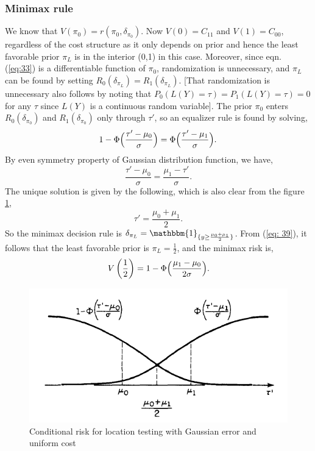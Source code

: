 \documentclass[a4paper,english,12pt]{article}
\begin{document}
\begin{exmp}
\subsubsection*{Minimax rule}
We know that $V(\pi_0)=r(\pi_0,\delta_{\pi_{0}})$. Now $V(0)=C_{11}$ and $V(1)=C_{00}$, regardless of the cost structure as it only depends on prior and hence the least favorable prior $\pi_{L}$ is in the interior (0,1) in this case. Moreover, since eqn. (\ref{eq:33}) is a differentiable function of $\pi_{0}$, randomization is unnecessary, and $\pi_{L}$ can be found by setting $R_{0}(\delta_{\pi_{L}})=R_{1}(\delta_{\pi_{L}})$. [That randomization is unnecessary also follows by noting that $P_{0}(L(Y)=\tau)=P_{1}(L(Y)=\tau)=0$ for any $\tau$ since $L(Y)$ is a continuous random variable]. The prior $\pi_{0}$ enters $R_{0}(\delta_{\pi_{0}})$ and $R_{1}(\delta_{\pi_{0}})$ only through $\tau'$, so an equalizer rule is found by solving,
\begin{equation}
1-\Phi\Bigl(\frac{\tau'-\mu_0}{\sigma}\Bigr)=\Phi\Bigl(\frac{\tau'-\mu_1}{\sigma}\Bigr).
\end{equation}
By even symmetry property of Gaussian distribution function, we have,
\begin{equation}
\frac{\tau'-\mu_0}{\sigma}=\frac{\mu_1-\tau'}{\sigma}.
\end{equation}
The unique solution is given by the following, which is also clear from the figure \ref{fig:minimaxerror},
\begin{equation}
\tau'=\frac{\mu_{0}+\mu_{1}}{2}.\label{eq: 39}
\end{equation}
So the minimax decision rule is $\delta_{\pi_L}=\mathbbm{1}_{\{ y\geq\frac{\mu_{0}+\mu_{1}}{2}\}}$. From (\ref{eq: 39}), it follows that the least favorable prior is $\pi_L=\frac{1}{2}$, and the minimax risk is,
\begin{equation}
V\left(\frac{1}{2}\right)=1-\Phi\Bigl(\frac{\mu_1-\mu_0}{2\sigma}\Bigr).
\end{equation}
\begin{figure}[h]
\centering
\includegraphics[width=0.6\linewidth]{Figures/Gauss_Minimax}
\caption{Conditional risk for location testing with Gaussian error and uniform cost}
\label{fig:minimaxerror}
\end{figure}

\end{exmp}
\end{document}
